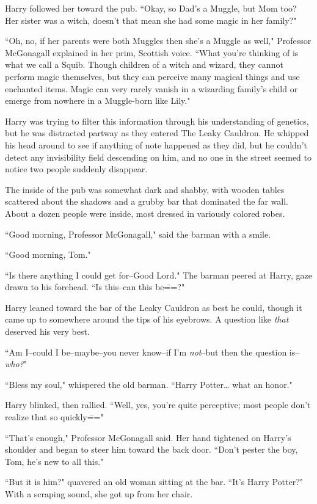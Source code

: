 Harry followed her toward the pub. ``Okay, so Dad's a Muggle, but Mom too? Her sister was a witch, doesn't that mean she had some magic in her family?"

``Oh, no, if her parents were both Muggles then she's a Muggle as well," Professor McGonagall explained in her prim, Scottish voice. ``What you're thinking of is what we call a Squib. Though children of a witch and wizard, they cannot perform magic themselves, but they can perceive many magical things and use enchanted items. Magic can very rarely vanish in a wizarding family's child or emerge from nowhere in a Muggle-born like Lily."

Harry was trying to filter this information through his understanding of genetics, but he was distracted partway as they entered The Leaky Cauldron. He whipped his head around to see if anything of note happened as they did, but he couldn't detect any invisibility field descending on him, and no one in the street seemed to notice two people suddenly disappear.

The inside of the pub was somewhat dark and shabby, with wooden tables scattered about the shadows and a grubby bar that dominated the far wall. About a dozen people were inside, most dressed in variously colored robes.

``Good morning, Professor McGonagall," said the barman with a smile.

``Good morning, Tom."

``Is there anything I could get for\---Good Lord." The barman peered at Harry, gaze drawn to his forehead. ``Is this\---can this be\===?"

Harry leaned toward the bar of the Leaky Cauldron as best he could, though it came up to somewhere around the tips of his eyebrows. A question like \emph{that} deserved his very best.

``Am I\---could I be\---maybe\---you never know\---if I'm \emph{not}\---but then the question is\---\emph{who?}"

``Bless my soul," whispered the old barman. ``Harry Potter{\ldots} what an honor."

Harry blinked, then rallied. ``Well, yes, you're quite perceptive; most people don't realize that so quickly\==="

``That's enough," Professor McGonagall said. Her hand tightened on Harry's shoulder and began to steer him toward the back door. ``Don't pester the boy, Tom, he's new to all this."

``But it is him?" quavered an old woman sitting at the bar. ``It's Harry Potter?" With a scraping sound, she got up from her chair.

